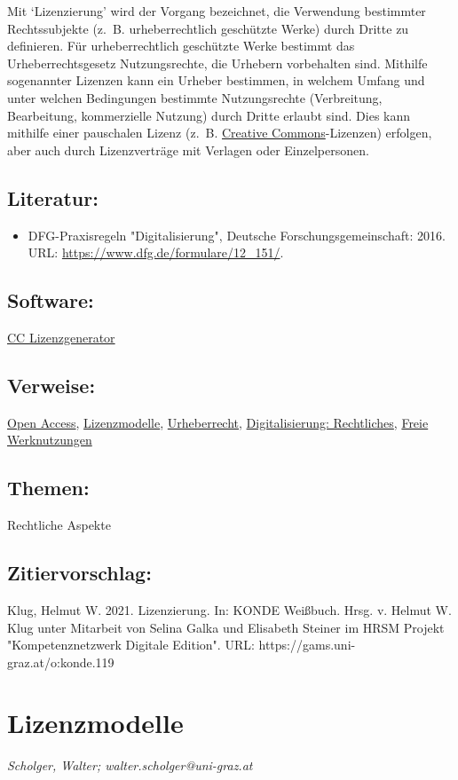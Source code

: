 \documentclass{article}
\begin{document}
    Mit ‘Lizenzierung’ wird der Vorgang bezeichnet, die Verwendung bestimmter Rechtssubjekte (z. B. urheberrechtlich geschützte Werke) durch Dritte zu definieren. Für urheberrechtlich geschützte Werke bestimmt das Urheberrechtsgesetz Nutzungsrechte, die Urhebern vorbehalten sind. Mithilfe sogenannter Lizenzen kann ein Urheber bestimmen, in welchem Umfang und unter welchen Bedingungen bestimmte Nutzungsrechte (Verbreitung, Bearbeitung, kommerzielle Nutzung) durch Dritte erlaubt sind. Dies kann mithilfe einer pauschalen Lizenz (z. B. \href{http://gams.uni-graz.at/o:konde.45}{Creative Commons}-Lizenzen) erfolgen, aber auch durch Lizenzverträge mit Verlagen oder Einzelpersonen.\\
            
        \subsection*{Literatur:}\begin{itemize}\item DFG-Praxisregeln "Digitalisierung", Deutsche Forschungsgemeinschaft: 2016. URL: \url{https://www.dfg.de/formulare/12_151/}.\end{itemize}\subsection*{Software:}\href{Vectr}{CC Lizenzgenerator}\subsection*{Verweise:}\href{https://gams.uni-graz.at/o:konde.152}{Open Access}, \href{https://gams.uni-graz.at/o:konde.9}{Lizenzmodelle}, \href{https://gams.uni-graz.at/o:konde.44}{Urheberrecht}, \href{https://gams.uni-graz.at/o:konde.223}{Digitalisierung: Rechtliches}, \href{https://gams.uni-graz.at/o:konde.222}{Freie Werknutzungen}\subsection*{Themen:}Rechtliche Aspekte\subsection*{Zitiervorschlag:}Klug, Helmut W. 2021. Lizenzierung. In: KONDE Weißbuch. Hrsg. v. Helmut W. Klug unter Mitarbeit von Selina Galka und Elisabeth Steiner im HRSM Projekt "Kompetenznetzwerk Digitale Edition". URL: https://gams.uni-graz.at/o:konde.119\newpage\section*{Lizenzmodelle} \emph{Scholger, Walter; walter.scholger@uni-graz.at }\\
        
\end{document}

